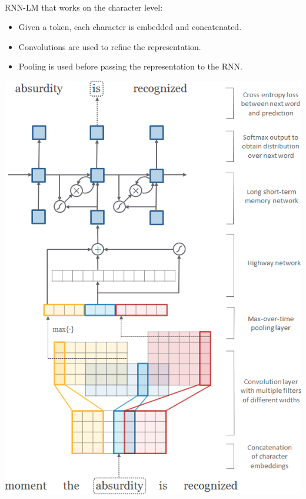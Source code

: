 \begin{example}
    \phantom{}\\
    \begin{minipage}{0.6\linewidth}
        RNN-LM that works on the character level:
        \begin{itemize}
            \item Given a token, each character is embedded and concatenated.
            \item Convolutions are used to refine the representation.
            \item Pooling is used before passing the representation to the RNN.
        \end{itemize}
    \end{minipage}
    \begin{minipage}{0.35\linewidth}
        \centering
        \includegraphics[width=0.95\linewidth]{./img/char_aware_rnn_cnn.png}
    \end{minipage}


\end{example}



